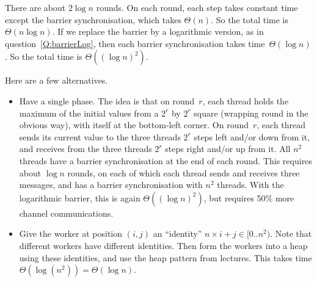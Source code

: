 \begin{answer}
\begin{enumerate}


There are about $2 \log n$ rounds.  On each round, each step takes constant
time except the barrier synchronisation, which takes $\Theta(n)$.  So the
total time is $\Theta(n \log n)$.  If we replace the barrier by a logarithmic
version, as in question~\ref{Q:barrierLog}, then each barrier synchronisation
takes time~$\Theta(\log n)$.  So the total time is $\Theta((\log n)^2)$.

Here are a few alternatives.
%
\begin{itemize}
\item
Have a single phase.  The idea is that on round~$r$, each thread holds the
maximum of the initial values from a $2^r$ by $2^r$ square (wrapping round in
the obvious way), with itself at the bottom-left corner.  On round~$r$, each
thread sends its current value to the three threads $2^r$ steps left and/or
down from it, and receives from the three threads $2^r$ steps right and/or up
from it.  All $n^2$ threads have a barrier synchronisation at the end of each
round.  This requires about $\log n$ rounds, on each of which each thread
sends and receives three messages, and has a barrier synchronisation with
$n^2$ threads.  With the logarithmic barrier, this is again $\Theta((\log
n)^2)$, but requires 50\% more channel communications.


\item
Give the worker at position $(i,j)$ an ``identity'' $n \times i + j \in [0
  .. n^2)$.  Note that different workers have different identities.  Then form
  the workers into a heap using these identities, and use the heap pattern
  from lectures.  This takes time $\Theta(\log(n^2)) = \Theta(\log n)$.


\end{itemize}
\end{enumerate}
\end{answer}
